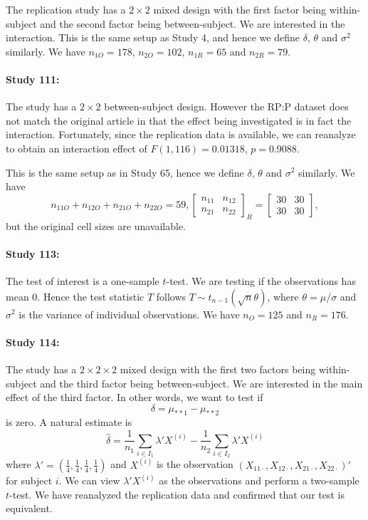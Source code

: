 \documentclass[11pt]{article}
\theoremstyle{definition}
\theoremstyle{custom}
\newcommand{\hdelta}{\hat{\delta}}
\begin{document}
  The replication study has a $2 \times 2$ mixed design with the first factor being within-subject and the second factor being between-subject. We are interested in the interaction. This is the same setup as Study 4, and hence we define $\delta$, $\theta$ and $\sigma^2$ similarly. We have $n_{1O} = 178$, $n_{2O} = 102$, $n_{1R} = 65$ and $n_{2R} = 79$.

  \paragraph{Study 111: \citet{Janiszewski:2008kg}}
  The study has a $2 \times 2$ between-subject design. However the RP:P dataset does not match the original article in that the effect being investigated is in fact the interaction. Fortunately, since the replication data is available, we can reanalyze to obtain an interaction effect of $F(1, 116) = 0.01318$, $p = 0.9088$.

  This is the same setup as in Study 65, hence we define $\delta$, $\theta$ and $\sigma^2$ similarly. We have
  \[
  n_{11O} + n_{12O} + n_{21O} + n_{22O} = 59, \begin{bmatrix}
  n_{11} & n_{12} \\
  n_{21} & n_{22}
  \end{bmatrix}_R = \begin{bmatrix}
  30 & 30 \\
  30 & 30
  \end{bmatrix},
  \]
  but the original cell sizes are unavailable.

  \paragraph{Study 113: \citet{Armor:2008jp}}
  The test of interest is a one-sample $t$-test. We are testing if the observations has mean $0$. Hence the test statistic $T$ follows $T \sim t_{n-1} (\sqrt{n} \theta)$, where $\theta = \mu / \sigma$ and $\sigma^2$ is the variance of individual observations. We have $n_O = 125$ and $n_R = 176$.

  \paragraph{Study 114: \citet{Addis:2008hf}}
  The study has a $2 \times 2 \times 2$ mixed design with the first two factors being within-subject and the third factor being between-subject. We are interested in the main effect of the third factor. In other words, we want to test if
  \[
  \delta = \mu_{**1} - \mu_{**2}
  \]
  is zero. A natural estimate is
  \[
  \hdelta = \frac{1}{n_1} \sum_{i \in I_1} \lambda' X^{(i)} - \frac{1}{n_2} \sum_{i \in I_2} \lambda' X^{(i)}
  \]
  where $\lambda' = (\frac{1}{4}, \frac{1}{4}, \frac{1}{4}, \frac{1}{4})$ and $X^{(i)}$ is the observation $(X_{11 \cdot}, X_{12 \cdot}, X_{21 \cdot}, X_{22 \cdot})'$ for subject $i$. We can view $\lambda' X^{(i)}$ as the observations and perform a two-sample $t$-test. We have reanalyzed the replication data and confirmed that our test is equivalent.
\end{document}
